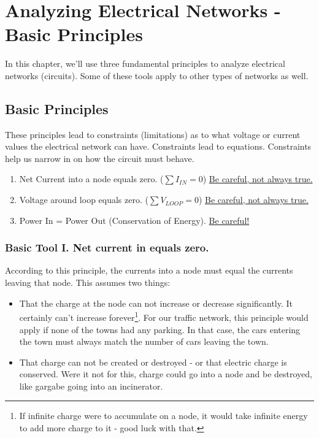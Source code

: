 \chapter{Analyzing Electrical Networks - Basic Principles}
In this chapter, we'll use three fundamental principles to analyze electrical networks (circuits). Some of these tools apply to other types of networks as well.

\par
\section{Basic Principles}
These principles lead to constraints (limitations) as to what voltage or current values the electrical network can have. Constraints lead to equations. Constraints help us narrow in on how the circuit must behave.

\begin{enumerate}
\item Net Current into a node equals zero. ($\sum{I_{IN}}=0$) \underline{Be careful, not always true.}
\item Voltage around loop equals zero. ($\sum{V_{LOOP}}=0$) \underline{Be careful, not always true.}
\item Power In = Power Out (Conservation of Energy). \underline{Be careful!}
\end{enumerate}

\subsection{Basic Tool I. Net current in equals zero.}
According to this principle, the currents into a node must equal the currents leaving that node. This assumes two things:

\begin{itemize}
\item That the charge at the node can not increase or decrease significantly. It certainly can't increase forever\footnote{If infinite charge were to accumulate on a node, it would take infinite energy to add more charge to it - good luck with that.}. For our traffic network, this principle would apply if none of the towns had any parking. In that case, the cars entering the town must always match the number of cars leaving the town.
\item That charge can not be created or destroyed - or that electric charge is conserved. Were it not for this, charge could go into a node and be destroyed, like gargabe going into an incinerator.
\end{itemize}
\par

